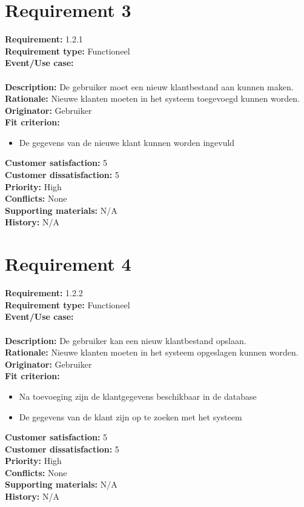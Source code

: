 \documentclass[11pt,english]{article}
\begin{document}
	\newpage
	\section{Requirement 3}
	\textbf{Requirement:} 1.2.1 \\
	\textbf{Requirement type:} Functioneel \\
	\textbf{Event/Use case:} \\
	\\
	\textbf{Description:} De gebruiker moet een nieuw klantbestand aan kunnen maken. \\
	\textbf{Rationale:} Nieuwe klanten moeten in het systeem toegevoegd kunnen worden. \\
	\textbf{Originator:} Gebruiker \\
	\textbf{Fit criterion:}
	\begin{itemize}
		\item De gegevens van de nieuwe klant kunnen worden ingevuld
	\end{itemize}
	\textbf{Customer satisfaction:} 5 \\
	\textbf{Customer dissatisfaction:} 5 \\
	\textbf{Priority:} High \\
	\textbf{Conflicts:} None \\
	\textbf{Supporting materials:} N/A \\
	\textbf{History:} N/A \\

	\newpage
	\section{Requirement 4}
	\textbf{Requirement:} 1.2.2 \\
	\textbf{Requirement type:} Functioneel \\
	\textbf{Event/Use case:} \\
	\\
	\textbf{Description:} De gebruiker kan een nieuw klantbestand opslaan. \\
	\textbf{Rationale:} Nieuwe klanten moeten in het systeem opgeslagen kunnen worden. \\
	\textbf{Originator:} Gebruiker \\
	\textbf{Fit criterion:}
	\begin{itemize}
		\item Na toevoeging zijn de klantgegevens beschikbaar in de database
		\item De gegevens van de klant zijn op te zoeken met het systeem
	\end{itemize}
	\textbf{Customer satisfaction:} 5 \\
	\textbf{Customer dissatisfaction:} 5 \\
	\textbf{Priority:} High \\
	\textbf{Conflicts:} None \\
	\textbf{Supporting materials:} N/A \\
	\textbf{History:} N/A \\
\end{document}
